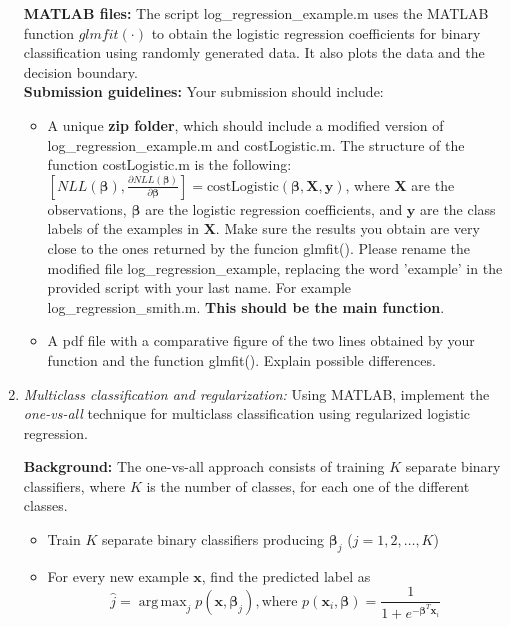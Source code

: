 \documentclass[11pt,oneside,a4paper]{article}
\DeclareMathOperator*{\argmax}{arg\,max}
\begin{document}
\begin{enumerate}
  
  \textbf{MATLAB files:} The script log\_regression\_example.m uses the MATLAB function $glmfit(\cdot)$ to obtain the logistic regression coefficients for binary classification using randomly generated data. It also plots the data and the decision boundary.
  \\
  \textbf{Submission guidelines:} Your submission should include:
  \begin{itemize}
  	\item A unique \textbf{zip folder}, which should include a modified version of log\_regression\_example.m and costLogistic.m. The structure of the function costLogistic.m is the following: $[NLL(\pmb{\beta}),\frac{\partial NLL(\pmb{\beta})}{\partial \pmb{\beta}}]=\text{costLogistic}(\pmb{\beta},\textbf{X},\textbf{y})$, where $\textbf{X}$ are the observations, $\pmb{\beta}$ are the logistic regression coefficients, and $\textbf{y}$ are the class labels of the examples in $\textbf{X}$. Make sure the results you obtain are very close to the ones returned by the funcion glmfit().
  	Please rename the modified file log\_regression\_example, replacing the word 'example' in the provided script with your last name. For example log\_regression\_smith.m. \textbf{This should be the main function}.
  	\item A pdf file with a comparative figure of the two lines obtained by your function and the function glmfit(). Explain possible differences.
  \end{itemize}
  
  
  \item \textit{Multiclass classification and regularization:} Using MATLAB, implement the \textit{one-vs-all} technique for multiclass classification using regularized logistic regression.
  
  \textbf{Background:} The one-vs-all approach consists of training $K$ separate binary classifiers, where $K$ is the number of classes, for each one of the different classes. 
  \begin{itemize}\nonumber
    \item Train $K$ separate binary classifiers producing $\pmb{\beta}_{j}$ ($j=1,2,\dots,K$)
    \item For every new example $\textbf{x}$, find the predicted label as
    \begin{equation}\nonumber
    \hat{j}=\argmax_{j} p(\textbf{x},\pmb{\beta}_j), \text{where }  p(\mathbf{x}_i, \pmb{\beta} ) =\frac{1}{1+e^{-\pmb{\beta}^T\mathbf{x}_i}}
    \end{equation}
  \end{itemize}  
  

\end{enumerate}
\end{document}
